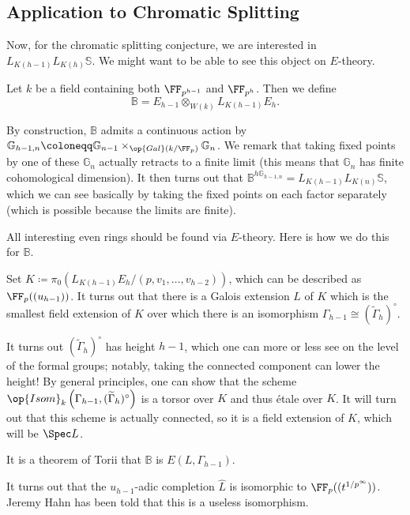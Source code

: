 \documentclass[../notes.tex]{subfiles}
\begin{document}
\subsection{Application to Chromatic Splitting}
Now, for the chromatic splitting conjecture, we are interested in $L_{K(h-1)}L_{K(h)}\mathbb S$. We might want to be able to see this object on $E$-theory.
\begin{notation}
	Let $k$ be a field containing both $\FF_{p^{h-1}}$ and $\FF_{p^h}$. Then we define
	\[\mathbb B=E_{h-1}\otimes_{W(k)}L_{K(h-1)}E_h.\]
\end{notation}
\begin{remark}
	By construction, $\mathbb B$ admits a continuous action by $\mathbb G_{h-1,n}\coloneqq\mathbb G_{n-1}\times_{\op{Gal}(k/\FF_p)}\mathbb G_n$. We remark that taking fixed points by one of these $\mathbb G_n$ actually retracts to a finite limit (this means that $\mathbb G_n$ has finite cohomological dimension). It then turns out that $\mathbb B^{h\mathbb G_{h-1,n}}=L_{K(h-1)}L_{K(n)}\mathbb S$, which we can see basically by taking the fixed points on each factor separately (which is possible because the limits are finite).
\end{remark}
All interesting even rings should be found via $E$-theory. Here is how we do this for $\mathbb B$.
\begin{notation}
	Set $K\coloneqq\pi_0\left(L_{K(h-1)}E_h/(p,v_1,\ldots,v_{h-2})\right)$, which can be described as $\FF_p((u_{h-1}))$. It turns out that there is a Galois extension $L$ of $K$ which is the smallest field extension of $K$ over which there is an isomorphism $\Gamma_{h-1}\cong(\widetilde\Gamma_h)^\circ$.
\end{notation}
\begin{remark}
	It turns out $(\widetilde\Gamma_h)^\circ$ has height $h-1$, which one can more or less see on the level of the formal groups; notably, taking the connected component can lower the height! By general principles, one can show that the scheme $\op{Isom}_k\left(\Gamma_{h-1},(\widetilde\Gamma_h)^\circ\right)$ is a torsor over $K$ and thus \'etale over $K$. It will turn out that this scheme is actually connected, so it is a field extension of $K$, which will be $\Spec L$.
\end{remark}
\begin{remark}
	It is a theorem of Torii that $\mathbb B$ is $E(L,\Gamma_{h-1})$.
\end{remark}
\begin{remark}
	It turns out that the $u_{h-1}$-adic completion $\widehat L$ is isomorphic to $\FF_p((t^{1/p^\infty}))$. Jeremy Hahn has been told that this is a useless isomorphism.
\end{remark}
\end{document}
